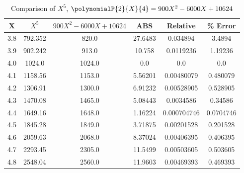 ﻿\begin{table}[h!]
    \centering
    \caption{Comparison of $X^5$, $\polynomialP{2}{X}{4} = 900X^2 - 6000X + 10624$}
    \begin{tabular}{|c|c|c|c|c|c|}
        \hline
        \textbf{X} & \textbf{$X^5$} & \textbf{$900X^2 - 6000X + 10624$} & \textbf{ABS} & \textbf{Relative} & \textbf{\% Error} \\ \hline
        3.8        & 792.352        & 820.0                             & 27.6483      & 0.034894          & 3.4894            \\ \hline
        3.9        & 902.242        & 913.0                             & 10.758       & 0.0119236         & 1.19236           \\ \hline
        4.0        & 1024.0         & 1024.0                            & 0.0          & 0.0               & 0.0               \\ \hline
        4.1        & 1158.56        & 1153.0                            & 5.56201      & 0.00480079        & 0.480079          \\ \hline
        4.2        & 1306.91        & 1300.0                            & 6.91232      & 0.00528905        & 0.528905          \\ \hline
        4.3        & 1470.08        & 1465.0                            & 5.08443      & 0.0034586         & 0.34586           \\ \hline
        4.4        & 1649.16        & 1648.0                            & 1.16224      & 0.000704746       & 0.0704746         \\ \hline
        4.5        & 1845.28        & 1849.0                            & 3.71875      & 0.00201528        & 0.201528          \\ \hline
        4.6        & 2059.63        & 2068.0                            & 8.37024      & 0.00406395        & 0.406395          \\ \hline
        4.7        & 2293.45        & 2305.0                            & 11.5499      & 0.00503605        & 0.503605          \\ \hline
        4.8        & 2548.04        & 2560.0                            & 11.9603      & 0.00469393        & 0.469393          \\ \hline

\end{tabular}
\end{table}

